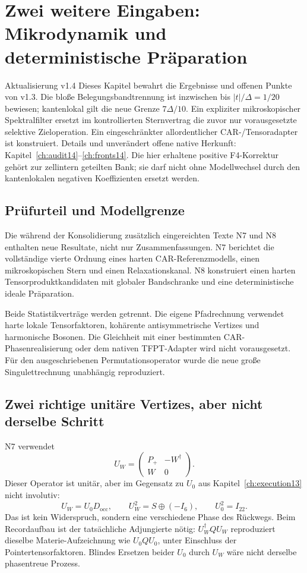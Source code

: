 \chapter{Zwei weitere Eingaben: Mikrodynamik und deterministische Präparation}
\label{ch:newinputs13}
\begin{bild}{Aktualisierung v1.4}
Dieses Kapitel bewahrt die Ergebnisse und offenen Punkte von v1.3. Die bloße Belegungsbandtrennung ist inzwischen bis $|t|/\Delta=1/20$ bewiesen; kantenlokal gilt die neue Grenze $7\Delta/10$. Ein expliziter mikroskopischer Spektralfilter ersetzt im kontrollierten Sternvertrag die zuvor nur vorausgesetzte selektive Zieloperation. Ein eingeschränkter allordentlicher CAR-/Tensoradapter ist konstruiert. Details und unverändert offene native Herkunft: Kapitel~\ref{ch:audit14}--\ref{ch:fronts14}. Die hier erhaltene positive F4-Korrektur gehört zur zellintern geteilten Bank; sie darf nicht ohne Modellwechsel durch den kantenlokalen negativen Koeffizienten ersetzt werden.
\end{bild}
\section{Prüfurteil und Modellgrenze}
Die während der Konsolidierung zusätzlich eingereichten Texte N7 und N8 enthalten neue Resultate, nicht nur Zusammenfassungen. N7 berichtet die vollständige vierte Ordnung eines harten CAR-Referenzmodells, einen mikroskopischen Stern und einen Relaxationskanal. N8 konstruiert einen harten Tensorproduktkandidaten mit globaler Bandschranke und eine deterministische ideale Präparation.

Beide Statistikverträge werden getrennt. Die eigene Pfadrechnung verwendet harte lokale Tensorfaktoren, kohärente antisymmetrische Vertizes und harmonische Bosonen. Die Gleichheit mit einer bestimmten CAR-Phasenrealisierung oder dem nativen TFPT-Adapter wird nicht vorausgesetzt. Für den ausgeschriebenen Permutationsoperator wurde die neue große Singulettrechnung unabhängig reproduziert.

\section{Zwei richtige unitäre Vertizes, aber nicht derselbe Schritt}
N7 verwendet
\begin{equation}
U_W=\begin{pmatrix}P_+&-W^\dagger\\W&0\end{pmatrix}.
\end{equation}
Dieser Operator ist unitär, aber im Gegensatz zu $U_0$ aus Kapitel~\ref{ch:execution13} nicht involutiv:
\begin{equation}
U_W=U_0D_{\mathrm{occ}},\qquad
U_W^2=S\oplus(-I_6),\qquad U_0^2=I_{22}.
\end{equation}
Das ist kein Widerspruch, sondern eine verschiedene Phase des Rückwegs. Beim Recordaufbau ist der tatsächliche Adjungierte nötig:
$U_W^\dagger Q U_W$ reproduziert dieselbe Materie-Aufzeichnung wie $U_0QU_0$, unter Einschluss der Pointertensorfaktoren. Blindes Ersetzen beider $U_0$ durch $U_W$ wäre nicht derselbe phasentreue Prozess.

